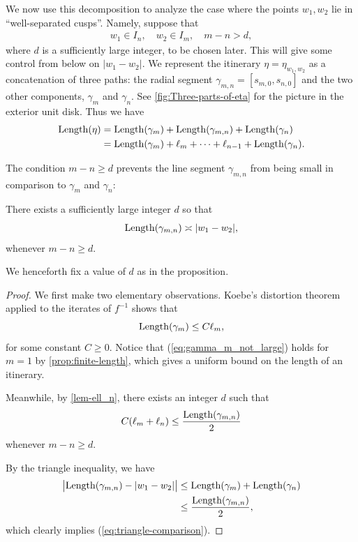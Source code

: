 We now use this decomposition to analyze the case where the points $w_1,w_2$ lie in ``well-separated cusps''. Namely, suppose that
\begin{align} \label{parabolic separation}
	w_1 \in I_n, \quad w_2 \in I_m, \quad m-n > d,
\end{align}
where $d$ is a sufficiently large integer, to be chosen later. 
This will give some control from below on $|w_1-w_2|$. 
We represent the itinerary $\eta=\eta_{w_1,w_2}$ as a concatenation of three paths: the radial segment $\gamma_{m,n}=[s_{m,0},s_{n,0}]$ and the two other components, $\gamma _m$ and $\gamma_n$. See \cref{fig:Three-parts-of-eta} for the picture in the exterior unit disk.
Thus we have
\begin{equation}
\begin{split}    
\operatorname{Length}(\eta) &=\operatorname{Length}(\gamma_m)+\operatorname{Length}(\gamma_{m,n})+\operatorname{Length}(\gamma_n) \\ 
&= \operatorname{Length}(\gamma_m)+\ell_m + \dots +\ell_{n-1}+\operatorname{Length}(\gamma_n).
\end{split}
\end{equation}



The condition $m-n \geq d$ prevents the line segment $\gamma _{m,n}$ from being small in comparison to $\gamma_m$ and $\gamma_n$:
\begin{proposition}
\label {case-3-proof}
There exists a sufficiently large integer $d$ so that 
	\begin{equation}
	\label{eq:triangle-comparison}
		\operatorname{Length}(\gamma_{m,n}) \asymp |w_1-w_2|,
	\end{equation}
	whenever $m-n \geq d$.
\end{proposition}

We henceforth fix a value of $d$ as in the proposition.
\begin{proof}
We first make two elementary observations. Koebe's distortion theorem applied to the iterates of $f^{-1}$ shows that
\begin{equation} \label{eq:gamma_m_not_large}
		\operatorname{Length}(\gamma_m) \leq C \ell_m,
	\end{equation}
for some constant $C \geq 0$. Notice that (\ref{eq:gamma_m_not_large}) holds for $m=1$ by \cref{prop:finite-length}, which gives a uniform bound on the length of an itinerary.

Meanwhile, by \cref{lem-ell_n}, there exists an integer $d$ such that
\begin{align}
C(\ell_m + \ell _n) \leq \frac{\operatorname{Length}(\gamma_{m,n})}{2}
\end{align}
whenever $m-n \geq d$.

By the triangle inequality, we have
\begin{align*} 
		\bigl | \operatorname{Length}(\gamma_{m,n}) - |w_1-w_2| \bigr | & \le \operatorname{Length}(\gamma_m)+\operatorname{Length}(\gamma_n) \\
		& \le \frac{\operatorname{Length}(\gamma_{m,n})}{2},
\end{align*}
which clearly implies (\ref{eq:triangle-comparison}).
\end{proof}


